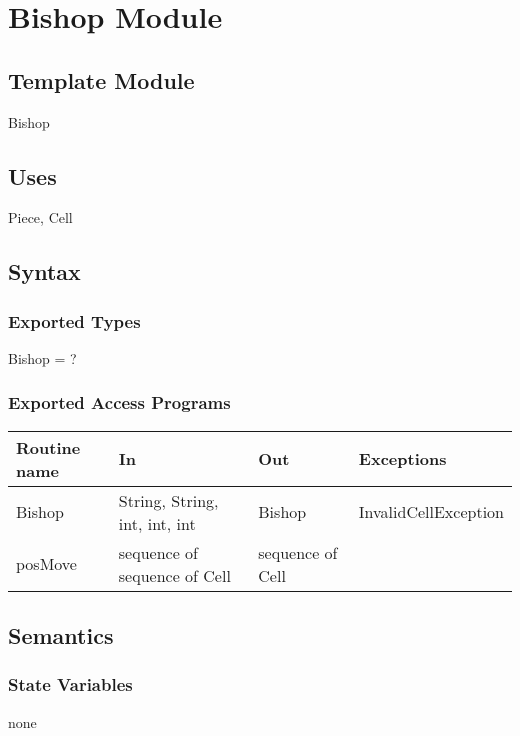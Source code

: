 \documentclass[12pt]{article}
\begin{document}
\newpage

\section* {Bishop Module}

\subsection*{Template Module}

Bishop

\subsection* {Uses}

Piece, Cell

\subsection* {Syntax}

\subsubsection* {Exported Types}

Bishop = ?

\subsubsection* {Exported Access Programs}

\begin{tabular}{| l | l | l | l |}
\hline
\textbf{Routine name} & \textbf{In} & \textbf{Out} & \textbf{Exceptions}\\
\hline
Bishop &String, String, int, int, int & Bishop & InvalidCellException\\
\hline
posMove & sequence of sequence of Cell & sequence of Cell & ~\\
\hline
\end{tabular}

\subsection* {Semantics}

\subsubsection* {State Variables}

none
\end{document}
